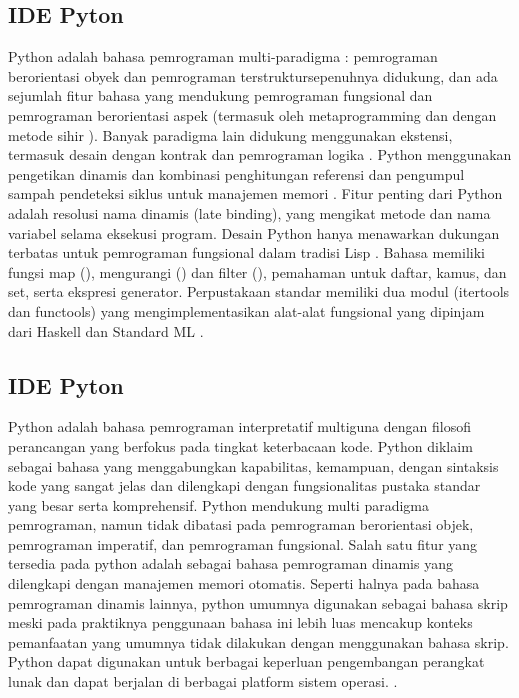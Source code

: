 \subsection{IDE Pyton}
Python adalah bahasa pemrograman multi-paradigma : pemrograman berorientasi obyek dan pemrograman terstruktursepenuhnya didukung, dan ada sejumlah fitur bahasa yang mendukung pemrograman fungsional dan pemrograman berorientasi aspek (termasuk oleh metaprogramming dan dengan metode sihir ).  Banyak paradigma lain didukung menggunakan ekstensi, termasuk desain dengan kontrak  dan pemrograman logika .
Python menggunakan pengetikan dinamis dan kombinasi penghitungan referensi dan pengumpul sampah pendeteksi siklus untuk manajemen memori . Fitur penting dari Python adalah resolusi nama dinamis (late binding), yang mengikat metode dan nama variabel selama eksekusi program.
Desain Python hanya menawarkan dukungan terbatas untuk pemrograman fungsional dalam tradisi Lisp . Bahasa memiliki fungsi map (), mengurangi () dan filter (), pemahaman untuk daftar, kamus, dan set, serta ekspresi generator. Perpustakaan standar memiliki dua modul (itertools dan functools) yang mengimplementasikan alat-alat fungsional yang dipinjam dari Haskell dan Standard ML . \cite{van2007python}

\subsection{IDE Pyton}
Python adalah bahasa pemrograman interpretatif multiguna dengan filosofi perancangan yang berfokus pada tingkat keterbacaan kode. Python diklaim sebagai bahasa yang menggabungkan kapabilitas, kemampuan, dengan sintaksis kode yang sangat jelas dan dilengkapi dengan fungsionalitas pustaka standar yang besar serta komprehensif. Python mendukung multi paradigma pemrograman, namun tidak dibatasi pada pemrograman berorientasi objek, pemrograman imperatif, dan pemrograman fungsional. Salah satu fitur yang tersedia pada python adalah sebagai bahasa  
pemrograman dinamis yang dilengkapi dengan manajemen memori otomatis. Seperti halnya pada bahasa pemrograman dinamis lainnya, python umumnya digunakan sebagai bahasa skrip meski pada praktiknya penggunaan bahasa ini lebih luas mencakup konteks pemanfaatan yang umumnya tidak dilakukan dengan menggunakan bahasa skrip. Python dapat digunakan untuk berbagai keperluan pengembangan perangkat lunak dan dapat berjalan di berbagai platform sistem operasi. \cite{rosmalasarana}.


